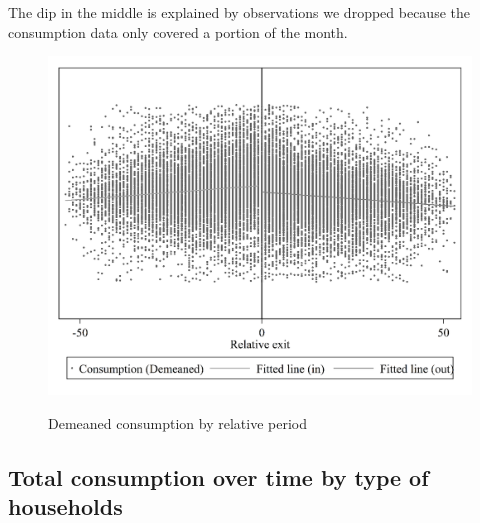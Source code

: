 The dip in the middle is explained by observations we dropped because the consumption data only covered a portion of the month.\par

\FloatBarrier

\begin{figure}[ht]
  \caption{Demeaned consumption by relative period}\label{fig:fifteen}
  \begin{center}
  {\includegraphics[width=1\textwidth]{./figures/image15.png}}
  \end{center}
\end{figure}

\FloatBarrier

\clearpage

\subsection{Total consumption over time by type of households}\label{appendix:D}

